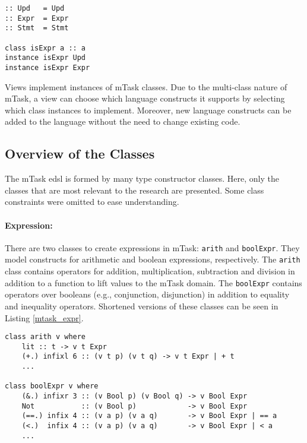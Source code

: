 \begin{lstlisting}[caption=mTask construction kinds, captionpos=b,label=mtask_kinds]
:: Upd   = Upd
:: Expr  = Expr
:: Stmt  = Stmt

class isExpr a :: a
instance isExpr Upd
instance isExpr Expr
\end{lstlisting}

Views implement instances of mTask classes. Due to the multi-class nature of mTask, a view can choose which language constructs it supports by selecting which class instances to implement. Moreover, new language constructs can be added to the language without the need to change existing code. 


\subsection{Overview of the Classes}\label{sec:mtask_classes}

The mTask \ac{edsl} is formed by many type constructor classes. Here, only the classes that are most relevant to the research are presented. Some class constraints were omitted to ease understanding.

\paragraph{Expression:} There are two classes to create expressions in mTask: \texttt{arith} and \texttt{boolExpr}. They model constructs for arithmetic and boolean expressions, respectively. The \texttt{arith} class contains operators for addition, multiplication, subtraction and division in addition to a function to lift values to the mTask domain. The \texttt{boolExpr} contains operators over booleans (e.g., conjunction, disjunction) in addition to equality and inequality operators. Shortened versions of these classes can be seen in Listing \ref{mtask_expr}. 

\begin{lstlisting}[caption=mTask expression classes,captionpos=b,label=mtask_expr]
class arith v where
	lit :: t -> v t Expr 
	(+.) infixl 6 :: (v t p) (v t q) -> v t Expr | + t
	...

class boolExpr v where
	(&.) infixr 3 :: (v Bool p) (v Bool q) -> v Bool Expr 
	Not           :: (v Bool p)            -> v Bool Expr 
	(==.) infix 4 :: (v a p) (v a q)       -> v Bool Expr | == a
	(<.)  infix 4 :: (v a p) (v a q)       -> v Bool Expr | < a
	...
\end{lstlisting}


